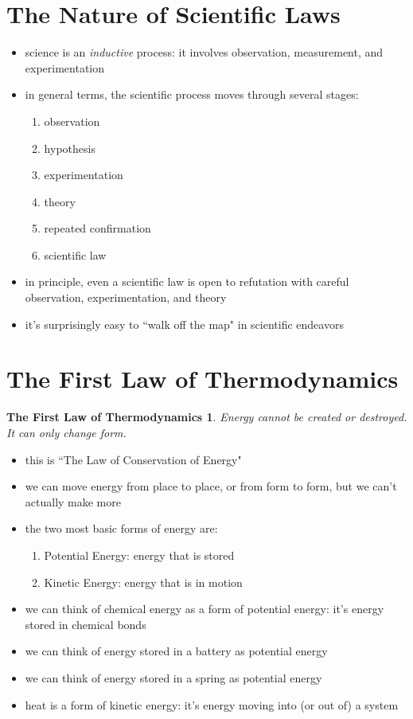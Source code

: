 \documentclass[11pt, oneside]{article}   	%
\newtheorem{law-thermo-d-1}{The First Law of Thermodynamics}[section]
\begin{document}
\section{The Nature of Scientific Laws}
\begin{itemize}
\item science is an \emph{inductive} process: it involves observation, measurement, and experimentation
\item in general terms, the scientific process moves through several stages:
\begin{enumerate}
\item observation
\item hypothesis
\item experimentation
\item theory
\item repeated confirmation
\item scientific law
\end{enumerate}
\item in principle, even a scientific law is open to refutation with careful observation, experimentation, and theory
\item it's surprisingly easy to ``walk off the map" in scientific endeavors
\end{itemize}

\section{The First Law of Thermodynamics}

\begin{law-thermo-d-1} \label{law:law-thermo-d-1}
Energy cannot be created or destroyed. It can only change form.
\end{law-thermo-d-1}

\begin{itemize}
\item this is ``The Law of Conservation of Energy"
\item we can move energy from place to place, or from form to form, but we can't actually make more
\item the two most basic forms of energy are:
\begin{enumerate}
\item Potential Energy: energy that is stored
\item Kinetic Energy: energy that is in motion
\end{enumerate}
\item we can think of chemical energy as a form of potential energy: it's energy stored in chemical bonds
\item we can think of energy stored in a battery as potential energy
\item we can think of energy stored in a spring as potential energy
\item heat is a form of kinetic energy: it's energy moving into (or out of) a system
\end{itemize}
\end{document}
